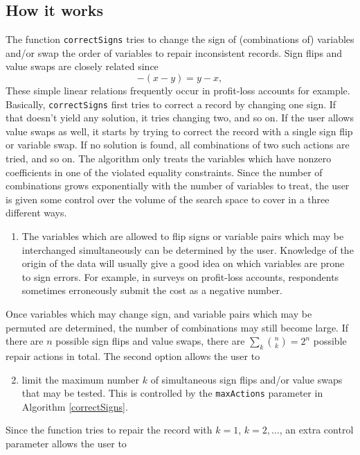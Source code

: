 \documentclass[11pt, fleqn, a4paper]{article}
\begin{document}
\subsection{How it works}
The function {\tt correctSigns} tries to change the sign of (combinations of)
variables and/or swap the order of variables to repair inconsistent records.
Sign flips and value swaps are closely related since
\begin{equation}
-(x - y) = y - x,
\end{equation}
These simple linear relations frequently occur in profit-loss accounts for
example.  Basically, {\tt correctSigns} first tries to correct a record by
changing one sign. If that doesn't yield any solution, it tries changing two,
and so on. If the user allows value swaps as well, it starts by trying to
correct the record with a single sign flip or variable swap. If no solution is
found, all combinations of two such actions are tried, and so on. The algorithm
only treats the variables which have nonzero coefficients in one of the
violated equality constraints.  Since the number of combinations grows
exponentially with the number of variables to treat, the user is given some
control over the volume of the search space to cover in a three different ways. 
\begin{enumerate}
\item The variables which are allowed to flip signs or variable pairs which
may be interchanged simultaneously can be determined by the user. Knowledge of
the origin of the data will usually give a good idea on which variables are
prone to sign errors.  For example, in surveys on profit-loss accounts,
respondents sometimes erroneously submit the cost as a negative number.
\end{enumerate}
Once variables which may change sign, and variable pairs which may be permuted
are determined, the number of combinations may still become large. If there are
$n$ possible sign flips and value swaps, there are $\sum_{k}{ n \choose k}=2^n$
possible repair actions in total. The second option allows the user to
\begin{enumerate}
\setcounter{enumi}{1}
\item limit the maximum number $k$ of simultaneous sign flips and/or value swaps
that may be tested. This is controlled by the {\tt maxActions} parameter in
Algorithm \ref{correctSigns}.  
\end{enumerate}
Since the function tries to repair the record with $k=1$, $k=2,\ldots$, an extra control parameter
allows the user to
\end{document}
